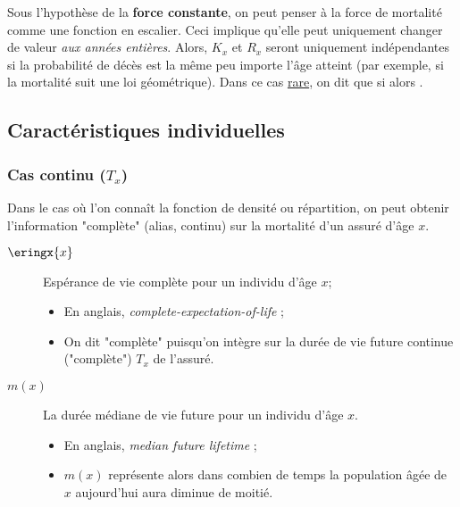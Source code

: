 \documentclass[10pt, french]{article}
\begin{document}
\begin{multicols*}{3}
\bigskip

Sous l'hypothèse de la \textbf{force constante}, on peut penser à la force de mortalité comme une fonction en escalier. Ceci implique qu'elle peut uniquement changer de valeur \textit{aux années entières}. Alors, $K_{x}$ et $R_{x}$ seront uniquement indépendantes si la probabilité de décès est la même peu importe l'âge atteint (par exemple, si la mortalité suit une loi géométrique). Dans ce cas \underline{rare}, on dit que si  alors .



\columnbreak
\subsection{Caractéristiques individuelles}

\subsubsection{Cas continu ($T_{x}$)}
\begin{rappel_enhanced}[Contexte]
Dans le cas où l'on connaît la fonction de densité ou répartition, on peut obtenir l'information "complète" (alias, continu) sur la mortalité d'un assuré d'âge $x$.
\end{rappel_enhanced}


\begin{distributions}[Notation]
\begin{description}
	\item[$\eringx{x}$]	Espérance de vie complète pour un individu d'âge $x$;
		\begin{itemize}[leftmargin = *]
		\item	En anglais, \og \textit{complete-expectation-of-life} \fg{};
		\item	On dit "complète" puisqu'on intègre sur la durée de vie future continue ("complète") $T_{x}$ de l'assuré.
		\end{itemize}
	\item[$m(x)$]	La durée médiane de vie future pour un individu d'âge $x$.
		\begin{itemize}[leftmargin = *]
		\item	En anglais, \og \textit{median future lifetime} \fg{};
		\item	$m(x)$ représente alors dans combien de temps la population âgée de $x$ aujourd'hui aura diminue de moitié. 
		\end{itemize}
\end{description}
\end{distributions}


\end{multicols*}
\end{document}
